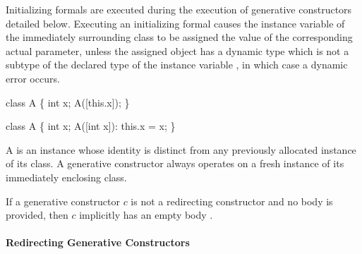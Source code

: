 \documentclass[makeidx]{article}
\begin{document}

\LMHash{}%
Initializing formals are executed during
the execution of generative constructors detailed below.
Executing an initializing formal 
causes the instance variable \id{} of the immediately surrounding class
to be assigned the value of the corresponding actual parameter,
unless the assigned object has a dynamic type
which is not a subtype of the declared type of the instance variable \id,
in which case a dynamic error occurs.


\begin{dartCode}
class A \{
  int x;
  A([this.x]);
\}
\end{dartCode}


\begin{dartCode}
class A \{
  int x;
  A([int x]): this.x = x;
\}
\end{dartCode}

\LMHash{}%
A  is an instance whose identity is distinct from
any previously allocated instance of its class.
A generative constructor always operates on a fresh instance of
its immediately enclosing class.


\LMHash{}%
If a generative constructor $c$ is not a redirecting constructor
and no body is provided, then $c$ implicitly has an empty body \code{\{\}}.


\paragraph{Redirecting Generative Constructors}
\end{document}
